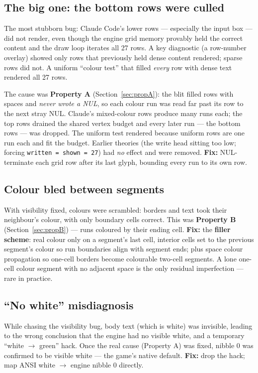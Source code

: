 \documentclass[11pt]{article}
\newcommand{\ic}[1]{\texttt{#1}}
\begin{document}
\subsection{The big one: the bottom rows were culled}
\label{sec:errvisible}
The most stubborn bug: Claude Code's lower rows --- especially the input box ---
did not render, even though the engine grid memory provably held the correct content
and the draw loop iterates all 27 rows. A key diagnostic (a row-number overlay) showed
only rows that previously held dense content rendered; sparse rows did not. A uniform
``colour test'' that filled \emph{every} row with dense text rendered all 27 rows.

The cause was \textbf{Property A} (Section~\ref{sec:propA}): the blit filled rows with
spaces and \emph{never wrote a NUL}, so each colour run was read far past its row to the
next stray NUL. Claude's mixed-colour rows produce many runs each; the top rows drained
the shared vertex budget and every later run --- the bottom rows --- was dropped. The
uniform test rendered because uniform rows are one run each and fit the budget. Earlier
theories (the write head sitting too low; forcing \ic{written = shown = 27}) had
\emph{no} effect and were removed. \textbf{Fix:} NUL-terminate each grid row after its
last glyph, bounding every run to its own row.

\subsection{Colour bled between segments}
\label{sec:errcolour}
With visibility fixed, colours were scrambled: borders and text took their neighbour's
colour, with only boundary cells correct. This was \textbf{Property B}
(Section~\ref{sec:propB}) --- runs coloured by their ending cell. \textbf{Fix:} the
\textbf{filler scheme}: real colour only on a segment's last cell, interior cells set to
the previous segment's colour so run boundaries align with segment ends; plus space
colour propagation so one-cell borders become colourable two-cell segments. A lone
one-cell colour segment with no adjacent space is the only residual imperfection ---
rare in practice.

\subsection{``No white'' misdiagnosis}
\label{sec:errwhite}
While chasing the visibility bug, body text (which is white) was invisible, leading to
the wrong conclusion that the engine had no visible white, and a temporary
``white $\rightarrow$ green'' hack. Once the real cause (Property A) was fixed, nibble 0
was confirmed to be visible white --- the game's native default. \textbf{Fix:} drop the
hack; map ANSI white $\rightarrow$ engine nibble 0 directly.
\end{document}
